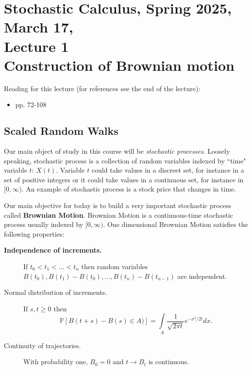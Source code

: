\documentclass[reqno,psamsfonts, 10pt]{amsart}
\theoremstyle{remark}
\begin{document}
\section*{Stochastic Calculus, Spring 2025, March 17, \\
Lecture 1\\
Construction of Brownian motion}


Reading for this lecture
(for references see the end of the lecture):
\begin{itemize}
\item \cite{1} pp. 72-108
\end{itemize}
\subsection*{Scaled Random Walks}

Our main object of study in this course will be
\textit{stochastic processes}. Loosely speaking, stochastic
process is a collection of random variables indexed by
``time" variable $t$: $X(t).$ Variable $t$ could take
values in a discreet set, for instance in a set of
positive integers or it could take values in a continuous
set, for instance in $[0,\infty).$ An example of stochastic
process is a stock price that changes in time.

Our main objective for today is to build a very important
stochastic process called \textbf{Brownian Motion}. Brownian
Motion is a continuous-time stochastic process usually indexed by
$[0,\infty).$ One dimensional Brownian Motion satisfies the
following properties:
\begin{description}
\item[\bf Independence of increments.] If $t_0 < t_1 < \dots <
t_n$ then random variables $B(t_0), B(t_1) - B(t_0), \dots, B(t_n)
- B(t_{n-1})$ are independent.

\item[Normal distribution of increments.] If $s, t \ge 0$
then
\begin{equation}
\mathbb{P}\left[ B(t+s) - B(s) \in A) \right] = \int \limits_A
\frac{1}{\sqrt{2 \pi t}} e^{-x^2/2t} dx.
\end{equation}

\item[Continuity of trajectories.] With probability one,
$B_0 = 0$ and $t \to B_t$ is continuous.
\end{description}
\end{document}
